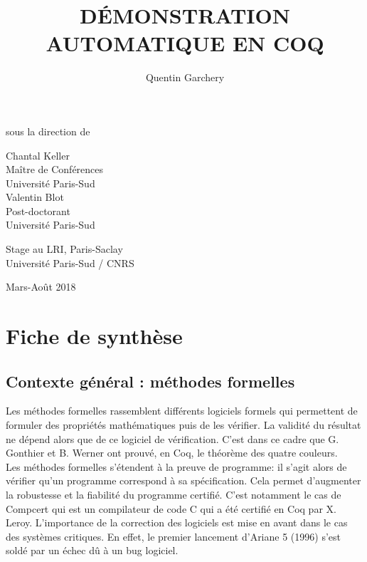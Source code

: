 \documentclass[11pt]{article}
\title{ {\Large \textbf{DÉMONSTRATION AUTOMATIQUE EN COQ}} }
\date{}
\author{Quentin Garchery}
\begin{document}
\maketitle
\thispagestyle{empty}

\begin{center}
\normalsize sous la direction de \\

\vspace{3mm}

\begin{multicols}{2}
\large Chantal Keller \\
Maître de Conférences\\
Université Paris-Sud \\

\large Valentin Blot \\
Post-doctorant\\
Université Paris-Sud
\end{multicols}

\vspace{7mm}

\Large{Stage au LRI, Paris-Saclay\\
Université Paris-Sud / CNRS \\}

\vspace{5mm}

\normalsize Mars-Août 2018

\end{center}


\vspace{2cm}


\section{Fiche de synthèse}

\subsection{Contexte général : méthodes formelles}

Les méthodes formelles rassemblent différents logiciels formels qui permettent de formuler des propriétés mathématiques puis de les vérifier. La validité du résultat ne dépend alors que de ce logiciel de vérification. C'est dans ce cadre que G. Gonthier et B. Werner ont prouvé, en Coq, le théorème des quatre couleurs.\\

Les méthodes formelles s'étendent à la preuve de programme: il s'agit alors de vérifier qu'un programme correspond à sa spécification. Cela permet d'augmenter la robustesse et la fiabilité du programme certifié. C'est notamment le cas de Compcert \cite{compcert} qui est un compilateur de code C qui a été certifié en Coq par X. Leroy. L'importance de la correction des logiciels est mise en avant dans le cas des systèmes critiques. En effet, le premier lancement d'Ariane 5 (1996) s'est soldé par un échec dû à un bug logiciel. 
\end{document}
